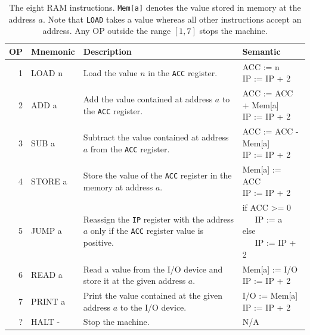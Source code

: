 \documentclass {aldast}
\begin{document}
\begin{table}[htbp]
  \begin{center}
    \begin{tabular}{r>{\ttfamily}lp{4cm}>{\ttfamily}p{3.5cm}}
      \toprule
      OP & Mnemonic & Description                                                                                                 & Semantic                          \\
      \midrule
      1  & LOAD n   & Load the value $n$ in the \texttt{ACC} register.                                                            & \makecell[tl]{ACC := n            \\IP := IP + 2 } \\[1cm]
      2  & ADD a    & Add the value contained at address $a$ to the \texttt{ACC} register.                                        & \makecell[tl]{ACC := ACC + Mem[a] \\ IP := IP + 2} \\[1cm]
      3  & SUB a    & Subtract the value contained at address $a$ from the \texttt{ACC} register.                                 & \makecell[tl]{ACC := ACC - Mem[a] \\ IP := IP + 2} \\[1cm]
      4  & STORE a  & Store the value of the \texttt{ACC} register in the memory at address $a$.                                  & \makecell[tl]{Mem[a] := ACC       \\ IP := IP + 2} \\[1cm]
      5  & JUMP a   & Reassign the \texttt{IP} register with the address $a$ only if the \texttt{ACC} register value is positive. & \makecell[tl]{if ACC >= 0         \\ ~~~IP := a \\ else \\ ~~~IP := IP + 2} \\[1.5cm]
      6  & READ a   & Read a value from the I/O device and store it at the given address $a$.                                     & \makecell[tl]{Mem[a] := I/O       \\ IP := IP + 2} \\[1cm]
      7  & PRINT a  & Print the value contained at the given address $a$ to the I/O device.                                       & \makecell[tl]{I/O := Mem[a]       \\ IP := IP + 2} \\[1cm]
      ?  & HALT -   & Stop the machine.                                                                                           & N/A                               \\
      \bottomrule
    \end{tabular}
  \end{center}
  \caption{The eight RAM instructions. \texttt{Mem[a]} denotes the
    value stored in memory at the address $a$. Note that \texttt{LOAD}
    takes a value whereas all other instructions accept an
    address. Any OP outside the range $[1, 7]$ stops the machine.}
  \label{tab:ram-instructions}
\end{table}
\end{document}

